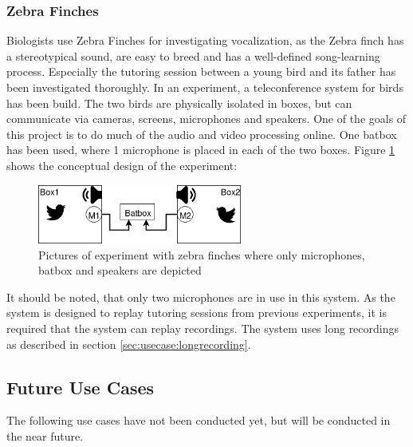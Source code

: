 \subsubsection{Zebra Finches} \label{sec:usecase:zebrafinches}
Biologists use Zebra Finches for investigating vocalization, as the Zebra finch has a stereotypical sound, are easy to breed and has a well-defined song-learning process. Especially the tutoring session between a young bird and its father has been investigated thoroughly. In an experiment, a teleconference system for birds has been build. The two birds are physically isolated in boxes, but can communicate via cameras, screens, microphones and speakers. One of the goals of this project is to do much of the audio and video processing online. One batbox has been used, where 1 microphone is placed in each of the two boxes.\citep{larsen2016system}
Figure \ref{fig:usecases:zebra:overview} shows the conceptual design of the experiment:

\begin{figure}[h!]
	\centering
	\includegraphics[width=0.6\textwidth]{figures/zebrafinches_experiment1.png}
	\caption{Pictures of experiment with zebra finches where only microphones, batbox and speakers are depicted}\label{fig:usecases:zebra:overview}
\end{figure}
It should be noted, that only two microphones are in use in this system.
As the system is designed to replay tutoring sessions from previous experiments, it is required that the system can replay recordings.
The system uses long recordings as described in section \ref{sec:usecase:longrecording}.


\subsection{Future Use Cases}
The following use cases have not been conducted yet, but will be conducted in the near future.

